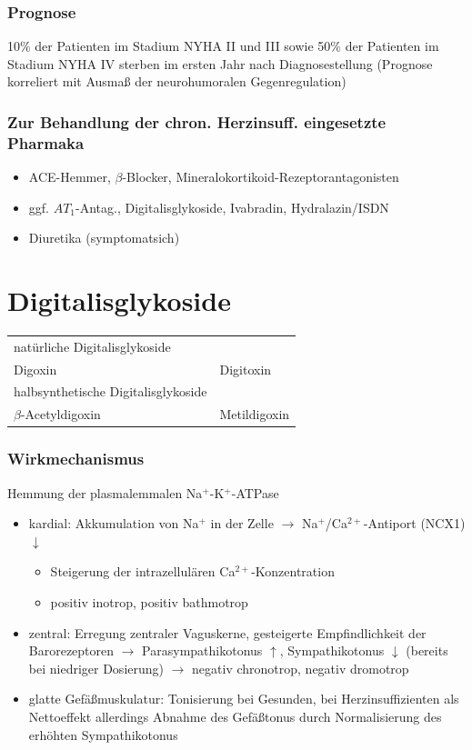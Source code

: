\documentclass[10pt,a4paper]{report}
\begin{document}
\subsubsection{Prognose}10\% der Patienten im Stadium NYHA II und III sowie 50\% der Patienten im Stadium NYHA IV sterben im ersten Jahr nach Diagnosestellung (Prognose korreliert mit  Ausmaß der neurohumoralen Gegenregulation)
\subsubsection{Zur Behandlung der chron. Herzinsuff. eingesetzte Pharmaka}
\begin{itemize}
	\item ACE-Hemmer, $\beta$-Blocker,  Mineralokortikoid-Rezeptorantagonisten 
	\item ggf. $AT_1$-Antag., Digitalisglykoside, Ivabradin, Hydralazin/ISDN 
	\item Diuretika (symptomatsich)
\end{itemize}
\section{Digitalisglykoside}
\begin{tabularx}{\textwidth}{XX}
natürliche Digitalisglykoside&\\
Digoxin&Digitoxin\\
halbsynthetische Digitalisglykoside&\\
$\beta$-Acetyldigoxin&Metildigoxin\\
\end{tabularx}
\subsubsection{Wirkmechanismus}
Hemmung der plasmalemmalen Na$^+$-K$^+$-ATPase 
\begin{itemize}
	\item kardial: Akkumulation von Na$^+$ in der Zelle $\rightarrow$ Na$^+$/Ca$^{2+}$-Antiport (NCX1) $\downarrow$
	\begin{itemize}
		\item Steigerung der intrazellulären Ca$^{2+}$-Konzentration 
		\item positiv inotrop, positiv bathmotrop
	\end{itemize}
	\item zentral: Erregung zentraler Vaguskerne, gesteigerte Empfindlichkeit der Barorezeptoren $\rightarrow$ Parasympathikotonus $\uparrow$, Sympathikotonus $\downarrow$ (bereits bei niedriger Dosierung)	$\rightarrow$ negativ chronotrop, negativ dromotrop
	\item glatte Gefäßmuskulatur: Tonisierung bei Gesunden, bei Herzinsuffizienten als Nettoeffekt allerdings Abnahme des Gefäßtonus durch Normalisierung des erhöhten Sympathikotonus
\end{itemize}
\end{document}
